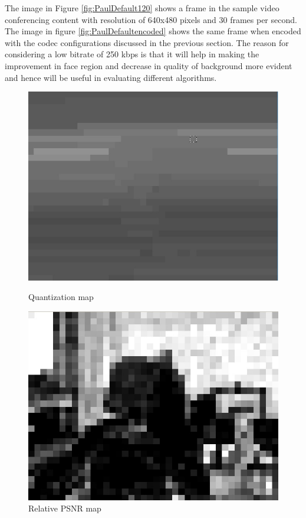 \documentclass[11pt]{article} %
\begin{document}
The image in Figure \ref{fig:PaulDefault120} shows a frame in the sample video conferencing content with resolution of 640x480 pixels and 30 frames per second. The image in figure \ref{fig:PaulDefaultencoded} shows the same frame when encoded with the codec configurations discussed in the previous section. The reason for considering a low bitrate of 250 kbps is that it will help in making the improvement in face region and decrease in quality of background more evident and hence will be useful in evaluating different algorithms. 

\begin{figure}[!h]
    \centering
    \includegraphics[scale=0.5]{PaulDefault120_91250kbps_quant}
    \caption{Quantization map}
    \label{fig:PaulDefault120Quant}
    \includegraphics[scale=0.5]{PaulDefault120_91250kbps_psnr}
    \caption{Relative PSNR map}
    \label{fig:PaulDefault120PSNR}
\end{figure} 
\end{document}
